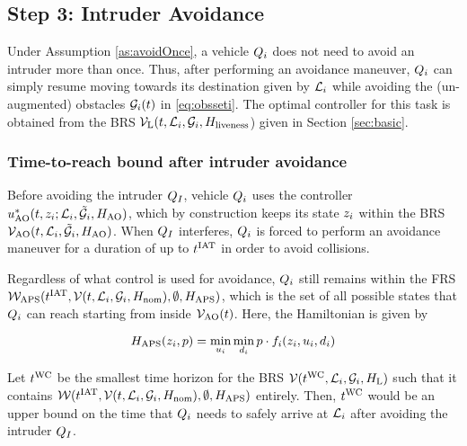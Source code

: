 \subsection{Step 3: Intruder Avoidance}
Under Assumption \ref{as:avoidOnce}, a vehicle $Q_{i}$ does not need to avoid an intruder more than once. Thus, after performing an avoidance maneuver, $Q_{i}$ can simply resume moving towards its destination given by $\mathcal{L}_i$ while avoiding the (un-augmented) obstacles $\mathcal{G}_i(t)$ in \eqref{eq:obsseti}. The optimal controller for this task is obtained from the BRS $\mathcal{V}_\text{L}(t, \mathcal{L}_i, \mathcal{G}_i, H_\text{liveness}$) given in Section \ref{sec:basic}.

\subsubsection{Time-to-reach bound after intruder avoidance}
Before avoiding the intruder $Q_{I}$, vehicle $Q_{i}$ uses the controller $u^*_\text{AO}(t, z_i; \mathcal{L}_i, \tilde{\mathcal{G}}_i, H_\text{AO})$, which by construction keeps its state $z_i$ within the BRS $\mathcal{V}_\text{AO}(t, \mathcal{L}_i, \tilde{\mathcal{G}}_i, H_\text{AO})$. When $Q_{I}$ interferes, $Q_{i}$ is forced to perform an avoidance maneuver for a duration of up to $t^\text{IAT}$ in order to avoid collisions. 

Regardless of what control is used for avoidance, $Q_{i}$ still remains within the FRS $\mathcal{W}_\text{APS}(t^\text{IAT}, \mathcal{V}(t, \mathcal{L}_i, \mathcal{G}_i, H_\text{nom}), \emptyset, H_\text{APS})$, which is the set of all possible states that $Q_{i}$ can reach starting from inside $\mathcal{V}_\text{AO}(t)$. Here, the Hamiltonian is given by

\begin{equation}
H_\text{APS}(z_i, p) = \min_{u_i} \min_{d_i} p \cdot f_i (z_i, u_i, d_i)
\end{equation}

Let $t^\text{WC}$ be the smallest time horizon for the BRS $\mathcal{V}(t^\text{WC}, \mathcal{L}_i, \mathcal{G}_i, H_\text{L})$ such that it contains $\mathcal{W}(t^\text{IAT}, \mathcal{V}(t, \mathcal{L}_i, \mathcal{G}_i, H_\text{nom}), \emptyset, H_\text{APS})$ entirely. Then, $t^\text{WC}$ would be an upper bound on the time that $Q_{i}$ needs to safely arrive at $\mathcal{L}_i$ after avoiding the intruder $Q_{I}$.
